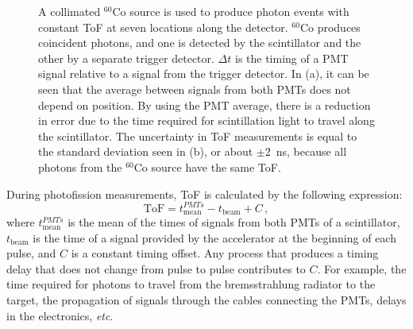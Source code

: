 \begin{figure}[h]
\caption{A collimated $^{60}$Co source is used to produce photon events with constant ToF at seven locations along the detector.
$^{60}$Co produces coincident photons, and one is detected by the scintillator and the other by a separate trigger detector.
 $\Delta t$ is the timing of a PMT signal relative to a signal from the trigger detector. 
 In (a), it can be seen that the average between signals from both PMTs does not depend on position.
By using the PMT average, there is a reduction in error due to the time required for scintillation light to travel along the scintillator.
The uncertainty in ToF measurements is equal to the standard deviation seen in (b), or about $\pm$2~ns, because all photons from the $^{60}$Co source have the same ToF.}
\label{fig:ConstPMTAvg}
\end{figure}

During photofission measurements, ToF is calculated by the following expression:
\begin{equation}
\label{eq:ToF}
\text{ToF} = t^{PMTs}_{\text{mean}} - t_{\text{beam}} + C \, ,
\end{equation}
where $t^{PMTs}_{\text{mean}}$ is the mean of the times of signals from both PMTs of a scintillator, $t_{\text{beam}}$ is the time of a signal provided by the accelerator at the beginning of each pulse, and $C$ is a constant timing offset.
Any process that produces a timing delay that does not change from pulse to pulse contributes to $C$.
For example, the time required for photons to travel from the bremsstrahlung radiator to the target, the propagation of signals through the cables connecting the PMTs, delays in the electronics, {\em{etc}}.

